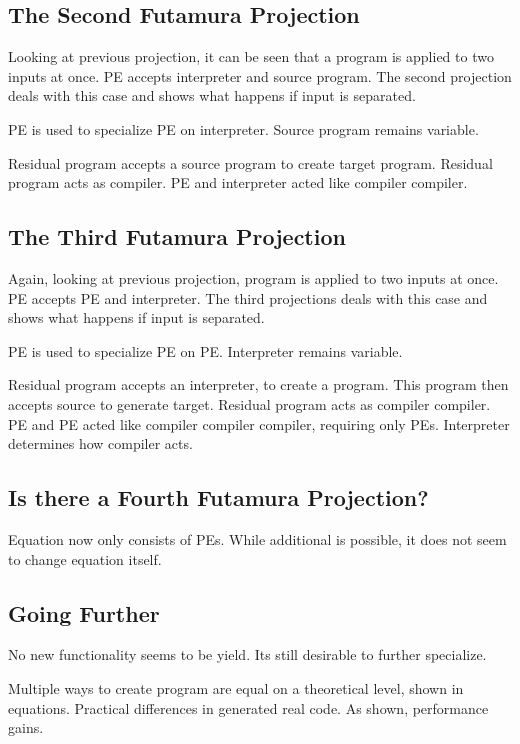 \subsection{The Second Futamura Projection}\label{sec:futamura-second}

Looking at previous projection, it can be seen that a program is applied to two inputs at once.
PE accepts interpreter and source program.
The second projection deals with this case and shows what happens if input is separated.

PE is used to specialize PE on interpreter.
Source program remains variable.

Residual program accepts a source program to create target program.
Residual program acts as compiler.
PE and interpreter acted like compiler compiler.


\subsection{The Third Futamura Projection}\label{sec:futamura-thrid}

Again, looking at previous projection, program is applied to two inputs at once.
PE accepts PE and interpreter.
The third projections deals with this case and shows what happens if input is separated.

PE is used to specialize PE on PE.
Interpreter remains variable.

Residual program accepts an interpreter, to create a program.
This program then accepts source to generate target.
Residual program acts as compiler compiler.
PE and PE acted like compiler compiler compiler, requiring only PEs.
Interpreter determines how compiler acts.


\subsection{Is there a Fourth Futamura Projection?}\label{sec:futamura-fourth}

Equation now only consists of PEs.
While additional is possible, it does not seem to change equation itself.


\subsection{Going Further}\label{sec:self-application}

No new functionality seems to be yield.
Its still desirable to further specialize.

Multiple ways to create program are equal on a theoretical level, shown in equations.
Practical differences in generated real code.
As shown, performance gains.


